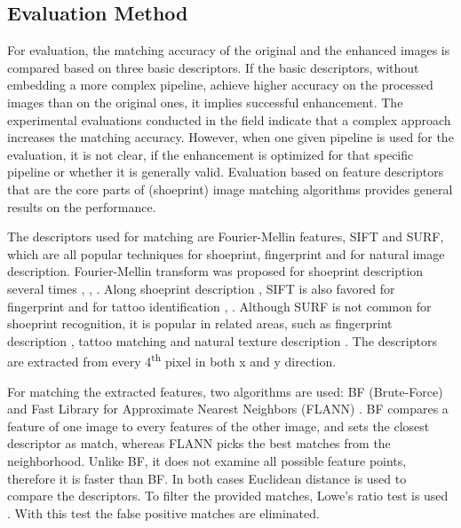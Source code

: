 \documentclass[draft,final]{vutinfth} %
\begin{document}
\subsection{Evaluation Method}
\par
For evaluation, the matching accuracy of the original and the enhanced images is compared based on three basic descriptors.
If the basic descriptors, without embedding a more complex pipeline, achieve higher accuracy on the processed images than on the original ones, it implies successful enhancement. 
The experimental evaluations conducted in the field indicate \cite{rida2019forensic} that a complex approach increases the matching accuracy.
However, when one given pipeline is used for the evaluation, it is not clear, if the enhancement is optimized for that specific pipeline or whether it is generally valid.
Evaluation based on feature descriptors that are the core parts of (shoeprint) image matching algorithms provides general results on the performance.
\par
The descriptors used for matching are Fourier-Mellin features, SIFT and SURF, which are all popular techniques for shoeprint, fingerprint and for natural image description.
Fourier-Mellin transform was proposed for shoeprint description several times \cite{gueham2008automatic}, \cite{richetelli2017classification}, \cite{wu2019crime}.
Along shoeprint description \cite{nibouche2009rotation}, \cite{richetelli2017classification} SIFT is also favored for fingerprint \cite{zhou2011adaptive} and for tattoo identification \cite{yi2015impact}, \cite{han2013tattoo}.
Although SURF is not common for shoeprint recognition, it is popular in related areas, such as fingerprint description \cite{jahan2017robust}, tattoo matching \cite{yi2015impact} and natural texture description \cite{prabhakar2012lbp}.
The descriptors are extracted from every 4\textsuperscript{th} pixel in both x and y direction.
\par
For matching the extracted features, two algorithms are used:  BF (Brute-Force) \cite{schaeffer1993re} and Fast Library for Approximate Nearest Neighbors (FLANN) \cite{muja2009fast}.
BF compares a feature of one image to every features of the other image, and sets the closest descriptor as match, whereas FLANN picks the best matches from the neighborhood.
Unlike BF, it does not examine all possible feature points, therefore it is faster than BF.
In both cases Euclidean distance is used to compare the descriptors.
To filter the provided matches, Lowe's ratio test is used \cite{lowe2004distinctive}.
With this test the false positive matches are eliminated.
\end{document}
